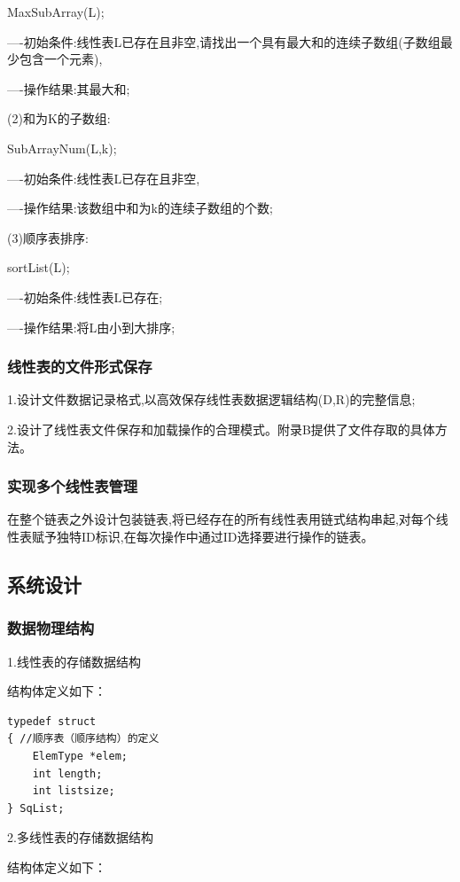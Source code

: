 \documentclass[supercite]{Experimental_Report}
\theoremstyle{definition}
\begin{document}
MaxSubArray(L); 

----初始条件:线性表L已存在且非空,请找出一个具有最大和的连续子数组(子数组最少包含一个元素),

----操作结果:其最大和;

(2)和为K的子数组:

SubArrayNum(L,k); 

----初始条件:线性表L已存在且非空, 

----操作结果:该数组中和为k的连续子数组的个数;

(3)顺序表排序:

sortList(L);

----初始条件:线性表L已存在;

----操作结果:将L由小到大排序;

\subsubsection{线性表的文件形式保存}

1.设计文件数据记录格式,以高效保存线性表数据逻辑结构(D,{R})的完整信息;

2.设计了线性表文件保存和加载操作的合理模式。附录B提供了文件存取的具体方法。

\subsubsection{实现多个线性表管理}

在整个链表之外设计包装链表,将已经存在的所有线性表用链式结构串起,对每个线性表赋予独特ID标识,在每次操作中通过ID选择要进行操作的链表。

\subsection{系统设计}

\subsubsection{数据物理结构}

1.线性表的存储数据结构

结构体定义如下：

\begin{lstlisting}
typedef struct
{ //顺序表（顺序结构）的定义
    ElemType *elem;
    int length;
    int listsize;
} SqList;
\end{lstlisting}

2.多线性表的存储数据结构

结构体定义如下：
\end{document}
